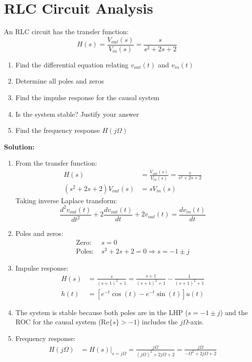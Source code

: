 \documentclass{article}
\begin{document}
\section{RLC Circuit Analysis}
An RLC circuit has the transfer function:
\[ H(s) = \frac{V_{out}(s)}{V_{in}(s)} = \frac{s}{s^2 + 2s + 2} \]
\begin{enumerate}[label=(\alph*)]
    \item Find the differential equation relating $v_{out}(t)$ and $v_{in}(t)$
    \item Determine all poles and zeros
    \item Find the impulse response for the causal system
    \item Is the system stable? Justify your answer
    \item Find the frequency response $H(j\Omega)$
\end{enumerate}

\textbf{Solution:}
\begin{enumerate}[label=(\alph*)]
    \item From the transfer function:
    \begin{align*}
        H(s) &= \frac{V_{out}(s)}{V_{in}(s)} = \frac{s}{s^2 + 2s + 2} \\
        (s^2 + 2s + 2)V_{out}(s) &= sV_{in}(s)
    \end{align*}
    Taking inverse Laplace transform:
    \[ \frac{d^2v_{out}(t)}{dt^2} + 2\frac{dv_{out}(t)}{dt} + 2v_{out}(t) = \frac{dv_{in}(t)}{dt} \]
    
    \item Poles and zeros:
    \begin{align*}
        \text{Zero: } & s = 0 \\
        \text{Poles: } & s^2 + 2s + 2 = 0 \Rightarrow s = -1 \pm j
    \end{align*}
    
    \item Impulse response:
    \begin{align*}
        H(s) &= \frac{s}{(s + 1)^2 + 1} = \frac{s + 1}{(s + 1)^2 + 1} - \frac{1}{(s + 1)^2 + 1} \\
        h(t) &= [e^{-t}\cos(t) - e^{-t}\sin(t)]u(t)
    \end{align*}
    
    \item The system is stable because both poles are in the LHP ($s = -1 \pm j$) and the ROC for the causal system ($\text{Re}\{s\} > -1$) includes the $j\Omega$-axis.
    
    \item Frequency response:
    \begin{align*}
        H(j\Omega) &= H(s)\bigg|_{s = j\Omega} = \frac{j\Omega}{(j\Omega)^2 + 2j\Omega + 2} = \frac{j\Omega}{-\Omega^2 + 2j\Omega + 2}
    \end{align*}
\end{enumerate}
\end{document}
